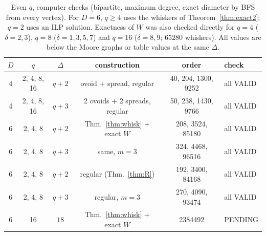 \begin{table}[ht]
\centering
\begin{tabular}{@{}cccccl@{}}
\toprule
$D$ & $q$ & $\Delta$ & construction & order & check \\
\midrule
4 & 2, 4, 8, 16 & $q+2$ & ovoid + spread, regular & 40, 204, 1300, 9252 & all VALID \\
4 & 2, 4, 8, 16 & $q+3$ & 2 ovoids + 2 spreads, regular & 50, 238, 1430, 9766 & all VALID \\
6 & 2, 4, 8 & $q+2$ & Thm.~\ref{thm:whisk} + exact $W$ & 208, 3524, 85180 & all VALID \\
6 & 2, 4, 8 & $q+3$ & same, $m=3$ & 324, 4468, 96516 & all VALID \\
6 & 2, 4, 8 & $q+2$ & regular (Thm.~\ref{thm:R}) & 192, 3400, 84168 & all VALID \\
6 & 2, 4, 8 & $q+3$ & regular, $m=3$ & 270, 4090, 93474 & all VALID \\
6 & 16 & $18$ & Thm.~\ref{thm:whisk} + exact $W$ & 2384492 & PENDING \\
\bottomrule
\end{tabular}
\caption{Even $q$, computer checks (bipartite, maximum degree, exact diameter by BFS from every vertex). For $D=6$, $q\ge4$ uses the whiskers of Theorem~\ref{thm:exact2}; $q=2$ uses an ILP solution. Exactness of $W$ was also checked directly for $q=4$ ($\delta=2,3$), $q=8$ ($\delta=1,3,5,7$) and $q=16$ ($\delta=8,9$; $65280$ whiskers). All values are below the Moore graphs or table values at the same $\Delta$.}\label{tab:even}
\end{table}

